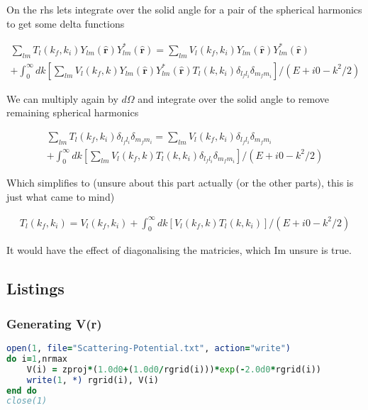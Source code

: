 \documentclass{article}
\renewcommand{\vec}[1]{\mathbf{#1}}
\let\oldhat\hat
\renewcommand{\hat}[1]{\oldhat{\mathbf{#1}}}
\begin{document}
    On the rhs lets integrate over the solid angle for a pair of the spherical harmonics to get some delta functions
    
    \begin{gather}
    	\sum_{lm}T_l(k_f,k_i)Y_{lm}(\vec{\hat{r}}) Y_{lm}^*(\vec{\hat{r}}) = \sum_{lm}V_l(k_f,k_i)Y_{lm}(\vec{\hat{r}}) Y_{lm}^*(\vec{\hat{r}})\\
    	+ \int_{0}^{\infty} dk \left[\sum_{lm}V_l(k_f,k)Y_{lm}(\vec{\hat{r}}) Y_{lm}^*(\vec{\hat{r}})T_l(k,k_i)\delta_{l_fl_i}\delta_{m_fm_i}\right]/\left(E + i0 -k^2/2\right)
    \end{gather}
    
    We can multiply again by $d\Omega$ and integrate over the solid angle to remove remaining spherical harmonics
    
    \begin{gather}
    	\sum_{lm}T_l(k_f,k_i)\delta_{l_fl_i}\delta_{m_fm_i} = \sum_{lm}V_l(k_f,k_i)\delta_{l_fl_i}\delta_{m_fm_i}\\
    	+ \int_{0}^{\infty} dk \left[\sum_{lm}V_l(k_f,k)T_l(k,k_i)\delta_{l_fl_i}\delta_{m_fm_i}\right]/\left(E + i0 -k^2/2\right)
    \end{gather}
    
    Which simplifies to (unsure about this part actually (or the other parts), this is just what came to mind)
    
    \begin{gather}
    	T_l(k_f,k_i) = V_l(k_f,k_i)
    	+ \int_{0}^{\infty} dk \left[V_l(k_f,k)T_l(k,k_i)\right]/\left(E + i0 -k^2/2\right)
    \end{gather}
    
    It would have the effect of diagonalising the matricies, which Im unsure is true. 


    \subsection{Listings}
    
    \subsubsection{Generating V(r)}
    \label{GeneratingV}
    
    \begin{lstlisting}[language=fortran]
open(1, file="Scattering-Potential.txt", action="write")
do i=1,nrmax
	V(i) = zproj*(1.0d0+(1.0d0/rgrid(i)))*exp(-2.0d0*rgrid(i))
	write(1, *) rgrid(i), V(i)
end do
close(1)
    \end{lstlisting}
    
\end{document}
